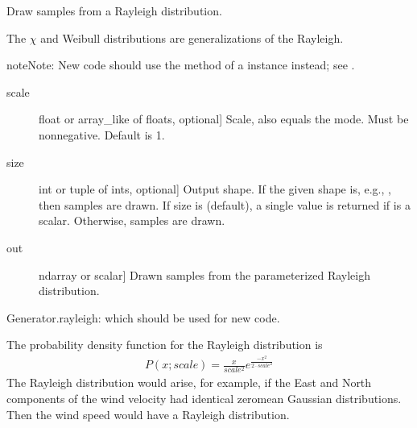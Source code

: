 \documentclass[letterpaper,10pt,english]{sphinxmanual}
\begin{document}
\begin{fulllineitems}
\label{\detokenize{infrapy.utils:infrapy.utils.ref2sac.rayleigh}}
Draw samples from a Rayleigh distribution.

The \(\chi\) and Weibull distributions are generalizations of the
Rayleigh.

\begin{sphinxadmonition}{note}{Note:}
New code should use the  method of a 
instance instead; see .
\end{sphinxadmonition}
\begin{description}
\item[{scale}] \leavevmode{[}float or array\_like of floats, optional{]}
Scale, also equals the mode. Must be non\sphinxhyphen{}negative. Default is 1.

\item[{size}] \leavevmode{[}int or tuple of ints, optional{]}
Output shape.  If the given shape is, e.g., , then
 samples are drawn.  If size is  (default),
a single value is returned if  is a scalar.  Otherwise,
 samples are drawn.

\end{description}
\begin{description}
\item[{out}] \leavevmode{[}ndarray or scalar{]}
Drawn samples from the parameterized Rayleigh distribution.

\end{description}

Generator.rayleigh: which should be used for new code.

The probability density function for the Rayleigh distribution is
\begin{equation*}
\begin{split}P(x;scale) = \frac{x}{scale^2}e^{\frac{-x^2}{2 \cdotp scale^2}}\end{split}
\end{equation*}
The Rayleigh distribution would arise, for example, if the East
and North components of the wind velocity had identical zero\sphinxhyphen{}mean
Gaussian distributions.  Then the wind speed would have a Rayleigh
distribution.


\end{fulllineitems}
\end{document}
